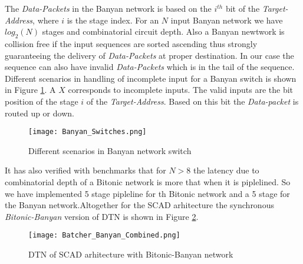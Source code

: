 					      The \textit{Data-Packets} in the Banyan network is based on the $i^{th}$ bit of the \textit{Target-Address}, where $i$ is the stage index. For an $N$ input Banyan network we have $log_{2}(N)$ 
					      stages and combinatorial circuit depth. Also a Banyan newtwork is collision free if the input sequences are sorted ascending
					      thus strongly guaranteeing the delivery of \textit{Data-Packets} at proper destination. In our case 
					      the sequence can also have invalid \textit{Data-Packets} which is in the tail of the sequence. Different scenarios in handling of incomplete input for a Banyan switch is shown in Figure \ref{fig:Banyan_Switches}.
					      A $X$ corresponds to incomplete inputs. The valid inputs are the bit position of the stage $i$ of the \textit{Target-Address}. Based on this bit the \textit{Data-packet} is routed up or down.
					      \begin{figure}[!ht]
						      \texttt{[image: Banyan\_Switches.png]}
						      \caption{Different scenarios in Banyan network switch }
					      \label{fig:Banyan_Switches}
					      \end{figure}
					      It has also verified with benchmarks \cite{sorting_network_on_fpgas} that for $N > 8$ the latency due to combinatorial depth of a Bitonic network is more that when it is piplelined. So we have implemented 5 stage pipleline 
					      for th Bitonic network and a 5 stage for the Banyan network.Altogether for the SCAD arhitecture the synchronous \textit{Bitonic-Banyan} version of DTN is shown in Figure \ref{fig:Batcher_Banyan_Combined}.
					      \begin{figure}[!ht]
						      \texttt{[image: Batcher\_Banyan\_Combined.png]}
						      \caption{DTN of SCAD arhitecture with Bitonic-Banyan network}
					      \label{fig:Batcher_Banyan_Combined}
					      \end{figure}
